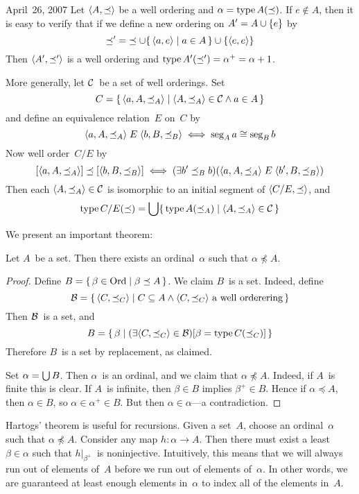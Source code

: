 \begin{lecture}{April~26, 2007}
Let \(\langle{A},{\preceq}\rangle\) be a well ordering and \(\alpha=\operatorname{type} A(\preceq)\). If \(e\not\in A\), then it is easy to verify that if we define a new ordering on \(A'=A\cup\{e\}\) by
\[\preceq'{=}\preceq\cup\{\,\langle{a},{e}\rangle\mid a\in A\,\}\cup\{\langle{e},{e}\rangle\}\]
Then \(\langle{A'},{\preceq'}\rangle\) is a well ordering and \(\operatorname{type} A'(\preceq')=\alpha^+=\alpha+1\).

More generally, let \(\mathcal{C}\)~be a set of well orderings. Set
\[C=\{\,\langle{a},{{A},{\preceq_A}}\rangle\mid \langle{A},{\preceq_A}\rangle\in\mathcal{C}\land a\in A\,\}\]
and define an equivalence relation~\(E\) on~\(C\) by
\[\langle{a},{{A},{\preceq_A}}\rangle\mathrel{E}\langle{b},{{B},{\preceq_B}}\rangle\iff\operatorname{seg}_A a\cong\operatorname{seg}_B b\]
Now well order~\(C/E\) by
\[[\langle{a},{{A},{\preceq_A}}\rangle]\preceq[\langle{b},{{B},{\preceq_B}}\rangle]\iff(\exists b'\preceq_B b)(\langle{a},{{A},{\preceq_A}}\rangle\mathrel{E}\langle{b'},{{B},{\preceq_B}}\rangle)\]
Then each \(\langle{A},{\preceq_A}\rangle\in\mathcal{C}\) is isomorphic to an initial segment of \(\langle{C/E},{\preceq}\rangle\), and
\[\operatorname{type} C/E(\preceq)=\bigcup\{\,\operatorname{type} A(\preceq_A)\mid\langle{A},{\preceq_A}\rangle\in\mathcal{C}\,\}\]

We present an important theorem:
\begin{thm}[Hartogs]
Let \(A\)~be a set. Then there exists an ordinal~\(\alpha\) such that \(\alpha\not\preceq A\).
\end{thm}
\begin{proof}
Define \(B=\{\,\beta\in\mathrm{Ord}\mid \beta\preceq A\,\}\). We claim \(B\)~is a set. Indeed, define
\[\mathcal{B}=\{\,\langle{C},{\preceq_C}\rangle\mid C\subseteq A\land\langle{C},{\preceq_C}\rangle\text{ a well orderering}\,\}\]
Then \(\mathcal{B}\)~is a set, and
\[B=\{\,\beta\mid (\exists\langle{C},{\preceq_C}\rangle\in\mathcal{B})[\beta=\operatorname{type} C(\preceq_C)]\,\}\]
Therefore \(B\)~is a set by replacement, as claimed.

Set \(\alpha=\bigcup B\). Then \(\alpha\)~is an ordinal, and we claim that \(\alpha\not\preceq A\). Indeed, if \(A\)~is finite this is clear. If \(A\)~is infinite, then \(\beta\in B\) implies \(\beta^+\in B\). Hence if \(\alpha\preceq A\), then \(\alpha\in B\), so \(\alpha\in\alpha^+\in B\). But then \(\alpha\in\alpha\)---a contradiction.
\end{proof}

Hartogs' theorem is useful for recursions. Given a set~\(A\), choose an ordinal~\(\alpha\) such that \(\alpha\not\preceq A\). Consider any map \(h:\alpha\to A\). Then there must exist a least \(\beta\in\alpha\) such that \(h|_{\beta^+}\)~is noninjective. Intuitively, this means that we will always run out of elements of~\(A\) before we run out of elements of~\(\alpha\). In other words, we are guaranteed at least enough elements in~\(\alpha\) to index all of the elements in~\(A\).


\end{lecture}
